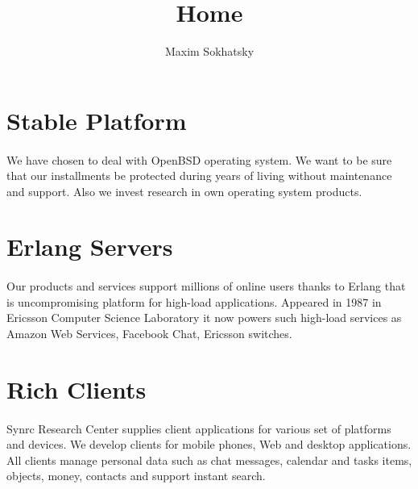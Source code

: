 \documentclass[11pt]{article}
\begin{document}

\title{Home}
\author{Maxim Sokhatsky}


\section*{Stable Platform}
\paragraph{}
We have chosen to deal with OpenBSD operating system. We want to be sure that our
installments be protected during years of living without maintenance and support.
Also we invest research in own operating system products.


\section*{Erlang Servers}
\paragraph{}
Our products and services support millions of online users thanks to Erlang that
is uncompromising platform for high-load applications. Appeared in 1987 in Ericsson Computer
Science Laboratory it now powers such high-load services as Amazon Web Services, Facebook Chat, Ericsson switches.

\section*{Rich Clients}
\paragraph{}
Synrc Research Center supplies client applications for various set of platforms and devices.
We develop clients for mobile phones, Web and desktop applications. All clients manage personal data such as
chat messages, calendar and tasks items, objects, money, contacts and support instant search.
\end{document}
